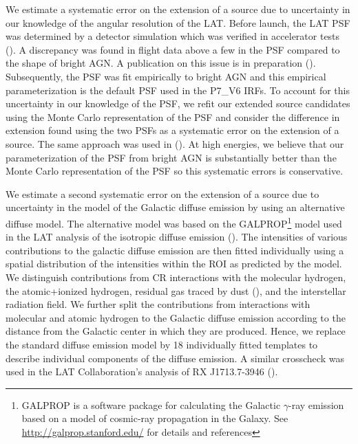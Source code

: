 \documentclass[12pt,preprint]{aastex}
\newcommand{\gev}{\text{GeV}\xspace}
\begin{document}

We estimate a systematic error on the extension of a source due to
uncertainty in our knowledge of the angular resolution of the LAT.  Before
launch, the LAT PSF was determined by a detector simulation which was
verified in accelerator tests (\cite{atwood_LAT_mission}).  A discrepancy
was found in flight data above a few \gev in the PSF compared to the
shape of bright AGN.  A publication on this issue is in preparation
(\cite{lat_on_orbit_psf}).  Subsequently, the PSF was fit empirically to
bright AGN and this empirical parameterization is the default PSF used
in the P7\_V6 IRFs.  To account for this uncertainty in our knowledge of
the PSF, we refit our extended source candidates using the Monte Carlo
representation of the PSF and consider the difference in extension found
using the two PSFs as a systematic error on the extension of a source.
The same approach was used in
(\cite{ic443}).  At high energies, we believe that our parameterization
of the PSF from bright AGN is substantially better than the Monte Carlo
representation of the PSF so this systematic errors is conservative.


We estimate a second systematic error on the extension of a source
due to uncertainty in the model of the Galactic diffuse emission by
using an alternative diffuse model. The alternative model was based on
the GALPROP\footnote{GALPROP is a software package for calculating the
Galactic $\gamma$-ray emission based on a model of cosmic-ray propagation
in the Galaxy. See \url{http://galprop.stanford.edu/} for details and
references} model used in the LAT analysis of the isotropic diffuse
emission (\cite{isotropic_lat}).  
The intensities of various contributions to the galactic
diffuse emission are then fitted individually using a spatial
distribution of the intensities within the ROI 
as predicted by the model.
We distinguish contributions from CR interactions with
the molecular hydrogen, the atomic+ionized hydrogen,
residual gas traced by dust (\cite{isabelle_dark_gass}),
and the interstellar radiation field. We further
split the contributions from interactions with molecular
and atomic hydrogen to the
Galactic diffuse emission according
to the distance from the Galactic center in
which they are produced. Hence, we replace
the standard diffuse emission model by 18
individually fitted templates to describe individual
components of the diffuse emission.
A similar crosscheck was used in the
LAT Collaboration's analysis of RX J1713.7-3946 (\cite{rx_j1713_lat}).
\end{document}
